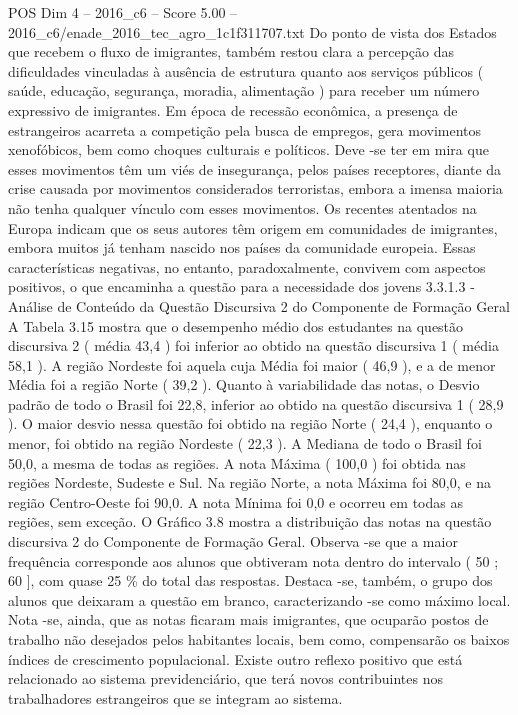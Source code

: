 \begin{textsample}{POS Dim 4 – 2016\_c6 – Score 5.00 – 2016\_c6/enade\_2016\_tec\_agro\_1c1f311707.txt}
Do ponto de vista dos Estados que recebem o fluxo de imigrantes, também restou clara a percepção das dificuldades vinculadas à ausência de estrutura quanto aos serviços públicos ( saúde, educação, segurança, moradia, alimentação ) para receber um número expressivo de imigrantes.
Em época de recessão econômica, a presença de estrangeiros acarreta a competição pela busca de empregos, gera movimentos xenofóbicos, bem como choques culturais e políticos.
Deve -se ter em mira que esses movimentos têm um viés de insegurança, pelos países receptores, diante da crise causada por movimentos considerados terroristas, embora a imensa maioria não tenha qualquer vínculo com esses movimentos.
Os recentes atentados na Europa indicam que os seus autores têm origem em comunidades de imigrantes, embora muitos já tenham nascido nos países da comunidade europeia.
Essas características negativas, no entanto, paradoxalmente, convivem com aspectos positivos, o que encaminha a questão para a necessidade dos jovens 3.3.1.3 - Análise de Conteúdo da Questão Discursiva 2 do Componente de Formação Geral A Tabela 3.15 mostra que o desempenho médio dos estudantes na questão discursiva 2 ( média 43,4 ) foi inferior ao obtido na questão discursiva 1 ( média 58,1 ).
A região Nordeste foi aquela cuja Média foi maior ( 46,9 ), e a de menor Média foi a região Norte ( 39,2 ).
Quanto à variabilidade das notas, o Desvio padrão de todo o Brasil foi 22,8, inferior ao obtido na questão discursiva 1 ( 28,9 ).
O maior desvio nessa questão foi obtido na região Norte ( 24,4 ), enquanto o menor, foi obtido na região Nordeste ( 22,3 ).
A Mediana de todo o Brasil foi 50,0, a mesma de todas as regiões.
A nota Máxima ( 100,0 ) foi obtida nas regiões Nordeste, Sudeste e Sul.
Na região Norte, a nota Máxima foi 80,0, e na região Centro-Oeste foi 90,0.
A nota Mínima foi 0,0 e ocorreu em todas as regiões, sem exceção.
O Gráfico 3.8 mostra a distribuição das notas na questão discursiva 2 do Componente de Formação Geral.
Observa -se que a maior frequência corresponde aos alunos que obtiveram nota dentro do intervalo ( 50 ; 60 ], com quase 25 \% do total das respostas.
Destaca -se, também, o grupo dos alunos que deixaram a questão em branco, caracterizando -se como máximo local.
Nota -se, ainda, que as notas ficaram mais imigrantes, que ocuparão postos de trabalho não desejados pelos habitantes locais, bem como, compensarão os baixos índices de crescimento populacional.
Existe outro reflexo positivo que está relacionado ao sistema previdenciário, que terá novos contribuintes nos trabalhadores estrangeiros que se integram ao sistema.

\end{textsample}
